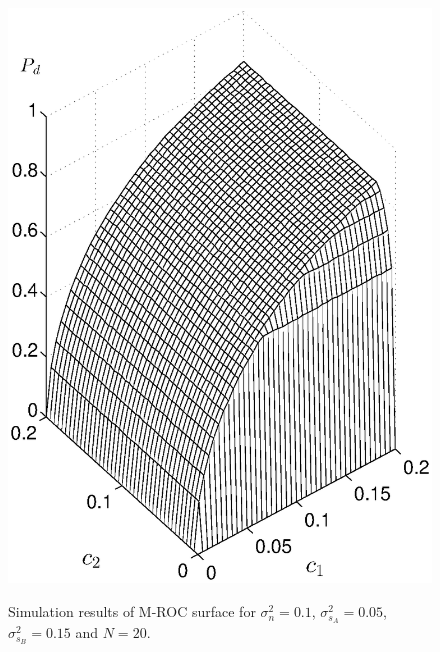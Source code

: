 \begin{figure}[!t]
\centering
\includegraphics[width=12cm, height=16cm]{4/c1c2pd.eps}
\caption{Simulation results of M-ROC surface for $\sigma_n^2 = 0.1$, $\sigma_{s_A}^2=0.05$, $\sigma_{s_B}^2=0.15$ and $N = 20$.}
\label{pic:2015may1}
\end{figure}



